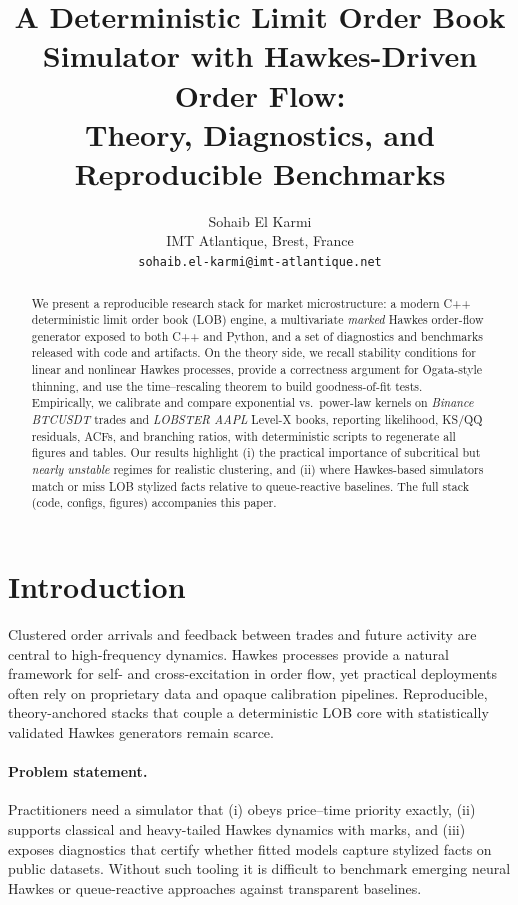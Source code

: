 \documentclass[11pt]{article}
\title{\textbf{A Deterministic Limit Order Book Simulator with Hawkes-Driven Order Flow:}\\
\textbf{Theory, Diagnostics, and Reproducible Benchmarks}}
\author{Sohaib El Karmi\\
\small IMT Atlantique, Brest, France\\
\small \texttt{sohaib.el-karmi@imt-atlantique.net}}
\date{}
\newcommand{\1}{\mathbbm{1}}
\begin{document}
\maketitle

\begin{abstract}
We present a reproducible research stack for market microstructure: a modern C++ deterministic limit order book (LOB) engine, a multivariate \emph{marked} Hawkes order-flow generator exposed to both C++ and Python, and a set of diagnostics and benchmarks released with code and artifacts. On the theory side, we recall stability conditions for linear and nonlinear Hawkes processes, provide a correctness argument for Ogata-style thinning, and use the time--rescaling theorem to build goodness-of-fit tests. Empirically, we calibrate and compare exponential vs.\ power-law kernels on \emph{Binance BTCUSDT} trades and \emph{LOBSTER AAPL} Level-X books, reporting likelihood, KS/QQ residuals, ACFs, and branching ratios, with deterministic scripts to regenerate all figures and tables. Our results highlight (i) the practical importance of subcritical but \emph{nearly unstable} regimes for realistic clustering, and (ii) where Hawkes-based simulators match or miss LOB stylized facts relative to queue-reactive baselines. The full stack (code, configs, figures) accompanies this paper.
\end{abstract}

\section{Introduction}
Clustered order arrivals and feedback between trades and future activity are central to high-frequency dynamics. Hawkes processes provide a natural framework for self- and cross-excitation in order flow, yet practical deployments often rely on proprietary data and opaque calibration pipelines. Reproducible, theory-anchored stacks that couple a deterministic LOB core with statistically validated Hawkes generators remain scarce.

\paragraph{Problem statement.} Practitioners need a simulator that (i) obeys price--time priority exactly, (ii) supports classical and heavy-tailed Hawkes dynamics with marks, and (iii) exposes diagnostics that certify whether fitted models capture stylized facts on public datasets. Without such tooling it is difficult to benchmark emerging neural Hawkes or queue-reactive approaches against transparent baselines.
\end{document}
